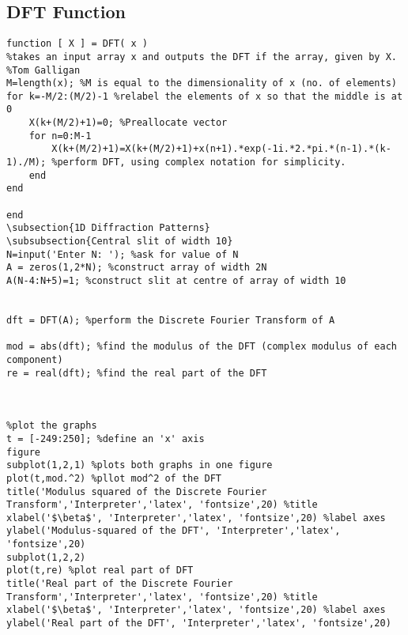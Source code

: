 \documentclass[a4paper,11pt]{article}
\begin{document}
\subsection{DFT Function}
\begin{lstlisting}[style=matlab-editor]
function [ X ] = DFT( x )
%takes an input array x and outputs the DFT if the array, given by X.
%Tom Galligan
M=length(x); %M is equal to the dimensionality of x (no. of elements)
for k=-M/2:(M/2)-1 %relabel the elements of x so that the middle is at 0
    X(k+(M/2)+1)=0; %Preallocate vector
    for n=0:M-1
        X(k+(M/2)+1)=X(k+(M/2)+1)+x(n+1).*exp(-1i.*2.*pi.*(n-1).*(k-1)./M); %perform DFT, using complex notation for simplicity.
    end
end

end
\subsection{1D Diffraction Patterns}
\subsubsection{Central slit of width 10}
N=input('Enter N: '); %ask for value of N
A = zeros(1,2*N); %construct array of width 2N
A(N-4:N+5)=1; %construct slit at centre of array of width 10


dft = DFT(A); %perform the Discrete Fourier Transform of A

mod = abs(dft); %find the modulus of the DFT (complex modulus of each component)
re = real(dft); %find the real part of the DFT



%plot the graphs
t = [-249:250]; %define an 'x' axis
figure
subplot(1,2,1) %plots both graphs in one figure
plot(t,mod.^2) %pllot mod^2 of the DFT
title('Modulus squared of the Discrete Fourier Transform','Interpreter','latex', 'fontsize',20) %title
xlabel('$\beta$', 'Interpreter','latex', 'fontsize',20) %label axes
ylabel('Modulus-squared of the DFT', 'Interpreter','latex', 'fontsize',20)
subplot(1,2,2)
plot(t,re) %plot real part of DFT
title('Real part of the Discrete Fourier Transform','Interpreter','latex', 'fontsize',20) %title
xlabel('$\beta$', 'Interpreter','latex', 'fontsize',20) %label axes
ylabel('Real part of the DFT', 'Interpreter','latex', 'fontsize',20)
\end{lstlisting}
\end{document}
